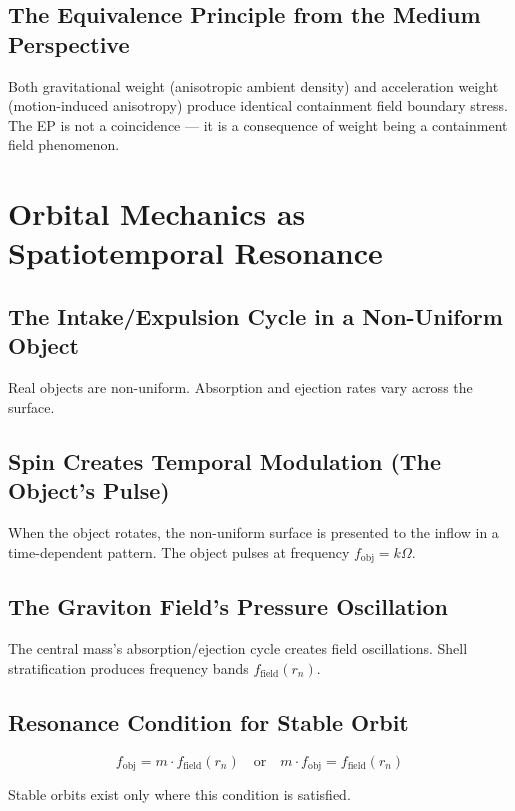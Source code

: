\documentclass[12pt, a4paper]{article}
\begin{document}
\subsection{The Equivalence Principle from the Medium Perspective}

Both gravitational weight (anisotropic ambient density) and acceleration weight (motion-induced anisotropy) produce identical containment field boundary stress. The EP is not a coincidence — it is a consequence of weight being a containment field phenomenon.

\section{Orbital Mechanics as Spatiotemporal Resonance}

\subsection{The Intake/Expulsion Cycle in a Non-Uniform Object}

Real objects are non-uniform. Absorption and ejection rates vary across the surface.

\subsection{Spin Creates Temporal Modulation (The Object's Pulse)}

When the object rotates, the non-uniform surface is presented to the inflow in a time-dependent pattern. The object pulses at frequency \( f_{\text{obj}} = k\Omega \).

\subsection{The Graviton Field's Pressure Oscillation}

The central mass's absorption/ejection cycle creates field oscillations. Shell stratification produces frequency bands \( f_{\text{field}}(r_n) \).

\subsection{Resonance Condition for Stable Orbit}
\[
f_{\text{obj}} = m \cdot f_{\text{field}}(r_n) \quad \text{or} \quad m \cdot f_{\text{obj}} = f_{\text{field}}(r_n)
\]

Stable orbits exist only where this condition is satisfied.
\end{document}
